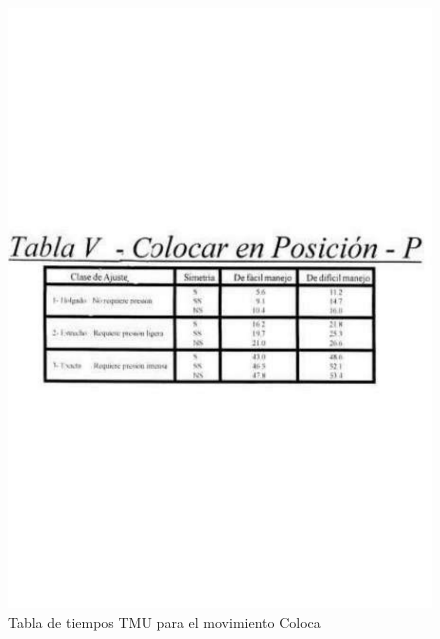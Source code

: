     \begin{figure}[H]
        \centering
        \includegraphics[trim = {20mm 40mm 20mm 25mm},clip,scale=0.25]{9/Img/tablaPosicion.pdf}
        \caption{ Tabla de tiempos TMU para el movimiento Coloca }
        \label{fig:bimanual}
    \end{figure}
    
